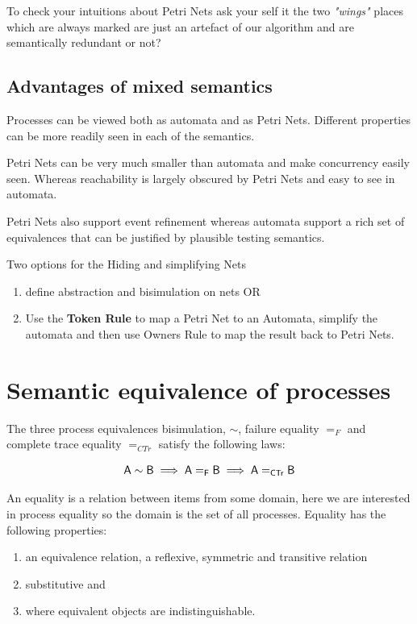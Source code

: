 \documentclass[]{article}
\begin{document}
To check your intuitions about Petri Nets ask your self it the two \emph{"wings"} places which are always marked are just an artefact of our algorithm and are semantically redundant or not?





\subsection{Advantages of mixed semantics}
Processes 
can be viewed both as automata and as Petri Nets. Different properties can be more readily seen in each of the semantics.

Petri Nets can be very much smaller than automata and make concurrency easily seen. Whereas reachability is largely obscured by Petri Nets and easy to see in automata. 

Petri Nets also  support event refinement whereas  automata support a rich set of equivalences that can be justified by plausible testing semantics. 


Two options for the  Hiding and simplifying  Nets
\begin{enumerate}
\item define abstraction and bisimulation on nets OR
\item Use the {\bf Token Rule} to map a Petri Net to an Automata, simplify the automata and then use {\sf Owners Rule } to map the result  back  to Petri Nets.
\end{enumerate}




\section{Semantic equivalence  of processes}
 The three process equivalences bisimulation, $\sim$, failure equality $=_F$ and complete trace equality $=_{CTr}$ satisfy the following laws:

\[ \sf A\sim B \implies A=_F B \implies A=_{CTr}B  \]

  An equality is a relation between  items from some domain, here we are interested in process equality so the domain is the set of all processes. Equality has the following properties:
 \begin{enumerate}
 \item an equivalence relation, a reflexive, symmetric and transitive relation
 \item substitutive and
 \item where equivalent objects are indistinguishable.
 \end{enumerate}
\end{document}
